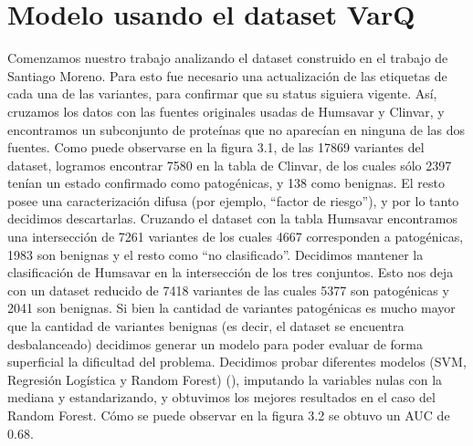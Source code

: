\section{Modelo usando el dataset VarQ}

Comenzamos nuestro trabajo analizando el dataset construido en el trabajo de Santiago Moreno. Para esto fue necesario una actualización de las etiquetas de cada una de las variantes, para confirmar que su status siguiera vigente. Así, cruzamos los datos con las fuentes originales usadas de Humsavar y Clinvar, y encontramos un subconjunto de proteínas que no aparecían en ninguna de las dos fuentes. Como puede observarse en la figura 3.1, de las  17869 variantes del dataset, logramos encontrar 7580 en la tabla de Clinvar, de los cuales sólo 2397 tenían un estado confirmado como patogénicas, y 138 como benignas. El resto posee una caracterización difusa (por ejemplo, ``factor de riesgo''), y por lo tanto decidimos descartarlas. Cruzando el dataset con la tabla Humsavar encontramos una intersección de 7261 variantes de los cuales 4667 corresponden a patogénicas, 1983 son benignas y el resto como ``no clasificado''. Decidimos mantener la clasificación de Humsavar en la intersección de los tres conjuntos. Esto nos deja con un dataset reducido de 7418 variantes de las cuales 5377 son patogénicas y 2041 son benignas. 
Si bien la cantidad de variantes patogénicas es mucho mayor que la cantidad de variantes benignas (es decir, el dataset se encuentra desbalanceado) decidimos generar un modelo para poder evaluar de forma superficial la dificultad del problema. Decidimos probar diferentes modelos (SVM, Regresión Logística y Random Forest) (), imputando la variables nulas con la mediana y estandarizando, y obtuvimos los mejores resultados en el caso del Random Forest. Cómo se puede observar en la figura 3.2 se obtuvo un AUC de 0.68. 


